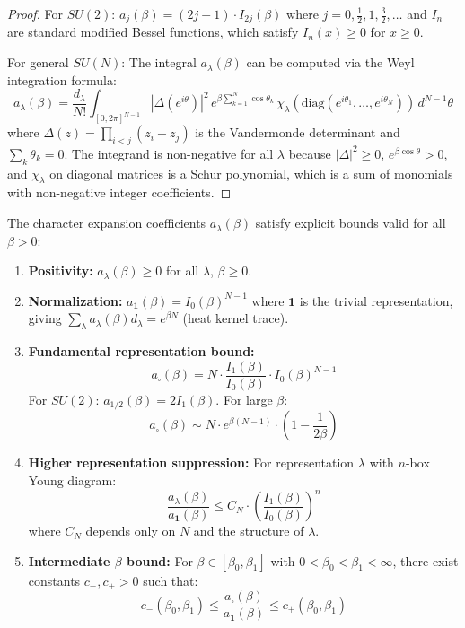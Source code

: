 \begin{proof}
For $SU(2)$: $a_j(\beta) = (2j+1) \cdot I_{2j}(\beta)$ where $j = 0, \frac{1}{2}, 1, \frac{3}{2}, \ldots$ 
and $I_n$ are standard modified Bessel functions, which satisfy $I_n(x) \geq 0$ for $x \geq 0$.

For general $SU(N)$: The integral $a_\lambda(\beta)$ can be computed via the 
Weyl integration formula:
\[
a_\lambda(\beta) = \frac{d_\lambda}{N!} \int_{[0,2\pi]^{N-1}} 
|\Delta(e^{i\theta})|^2 \, e^{\beta \sum_{k=1}^{N} \cos\theta_k} \, 
\chi_\lambda(\text{diag}(e^{i\theta_1}, \ldots, e^{i\theta_N})) \, d^{N-1}\theta
\]
where $\Delta(z) = \prod_{i<j}(z_i - z_j)$ is the Vandermonde determinant 
and $\sum_k \theta_k = 0$. The integrand is non-negative for all $\lambda$ 
because $|\Delta|^2 \geq 0$, $e^{\beta \cos\theta} > 0$, and $\chi_\lambda$ 
on diagonal matrices is a Schur polynomial, which is a sum of monomials with 
non-negative integer coefficients.
\end{proof}

\begin{theorem}
\label{thm:character-bounds-all-beta}
The character expansion coefficients $a_\lambda(\beta)$ satisfy explicit bounds 
valid for all $\beta > 0$:

\begin{enumerate}[label=(\roman*)]
\item \textbf{Positivity:} $a_\lambda(\beta) \geq 0$ for all $\lambda$, $\beta \geq 0$.

\item \textbf{Normalization:} $a_{\mathbf{1}}(\beta) = I_0(\beta)^{N-1}$ where $\mathbf{1}$ 
is the trivial representation, giving $\sum_\lambda a_\lambda(\beta) d_\lambda = e^{\beta N}$ 
(heat kernel trace).

\item \textbf{Fundamental representation bound:}
\[
a_{\square}(\beta) = N \cdot \frac{I_1(\beta)}{I_0(\beta)} \cdot I_0(\beta)^{N-1}
\]
For $SU(2)$: $a_{1/2}(\beta) = 2I_1(\beta)$. For large $\beta$:
\[
a_{\square}(\beta) \sim N \cdot e^{\beta(N-1)} \cdot \left(1 - \frac{1}{2\beta}\right)
\]

\item \textbf{Higher representation suppression:} For representation $\lambda$ 
with $n$-box Young diagram:
\[
\frac{a_\lambda(\beta)}{a_{\mathbf{1}}(\beta)} \leq C_N \cdot \left(\frac{I_1(\beta)}{I_0(\beta)}\right)^n
\]
where $C_N$ depends only on $N$ and the structure of $\lambda$.

\item \textbf{Intermediate $\beta$ bound:} For $\beta \in [\beta_0, \beta_1]$ with 
$0 < \beta_0 < \beta_1 < \infty$, there exist constants $c_-, c_+ > 0$ such that:
\[
c_-(\beta_0, \beta_1) \leq \frac{a_{\square}(\beta)}{a_{\mathbf{1}}(\beta)} \leq c_+(\beta_0, \beta_1)
\]
\end{enumerate}
\end{theorem}

